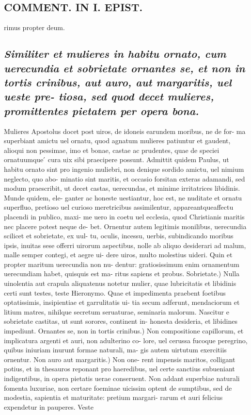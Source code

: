 \documentclass{article}
\begin{document}
\begin{pages}
\section*{COMMENT. IN I. EPIST. }
\marginpar{[ p.486 ]}\pstart rimus propter deum.  \pend
{}
{}
\subsection*{\textit{Similiter et mulieres in habitu ornato, cum uerecundia et sobrietate ornantes se, et non in tortis crinibus, aut auro, aut margaritis, uel ueste pre- tiosa, sed quod decet mulieres, promittentes pietatem per opera bona. }}\pstart Mulieres Apostolus docet post uiros, de idoneis earundem moribus, ne de for- ma superbiant amictu uel ornatu, quod agnatum mulieres patiuntur et gaudent, alioqui non pessimae, imo et bonae, castae ac prudentes, quae de speciei ornatuumque ́ cura uix sibi praecipere possunt. Admittit quidem Paulus, ut habitu ornato sint pro ingenio muliebri, non denique  sordido amictu, uel nimium neglecto, quo abo- minatio sint maritis, et occasio forsitan exteras adamandi, sed modum praescribit, ut decet castas, uerecundas, et minime irritatrices libidinis. Munde quidem, ele- ganter ac honeste uestiantur, hoc est, ne nuditate et ornatu superfluo, pretioso uel curioso meretricibus assimilentur, appareantqueaffectu placendi in publico, maxi- me uero in coetu uel ecclesia, quod Christianis maritis nec placere potest neque  de- bet. Ornentur autem legitimis monilibus, uerecundia scilicet et sobrietate, ex uul- tu, oculis, incessu, uerbis, subindicando moribus ipsis, inuitas sese offerri uirorum aspectibus, nolle ab aliquo desiderari ad malum, malle semper contegi, et aegre ui- dere uiros, multo molestius uideri. Quin et propter maritum uerecundia non nu- dentur: gratiosissimum enim ornamentum uerecundiam habet, quisquis est ma- ritus sapiens et probus. Sobrietate.) Nulla uinolentia aut crapula aliquatenus notetur mulier, quae lubricitatis et libidinis certi sunt testes, teste Hieronymo. Quae et impedimenta praebent foetibus optatissimis, insipientiae et garrulitatis ui- tia secum adferunt, mendaciorum et litium matres, nihilque  secretum seruaturae, seminaria malorum. Nascitur e sobrietate castitas, ut sunt sorores, continent in- honesta desideria, et libidines impediunt. Ornantes se, non in tortis crinibus.) Non compositione capillorum, et implicatura argenti et auri, non adulterino co- lore, uel cerussa fucoque  peregrino, quibus iniuriam inurunt formae naturali, ma- gis autem uirtutum exercitiis ornentur. Non auro aut margaritis.) Non one- rent impensis maritos, colligant potius, et in thesauros reponant pro haeredibus, uel certe sanctius subueniant indigentibus, in opera pietatis uerae conseruent. Non addant superbiae naturali fomenta luxuriae, non certare foeminae uicissim optent de sumptibus, sed de modestia, sapientia et maturitate: pretium margari- rarum et auri felicius expendetur in pauperes. Veste 
\end{pages}
\end{document}
